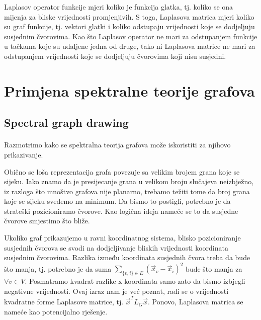 \documentclass[11pt]{article}
\begin{document}
	Laplasov operator funkcije mjeri koliko je funkcija glatka, tj. koliko se ona mijenja za bliske vrijednosti promjenjivih.
	S toga, Laplasova matrica mjeri koliko su graf funkcije, tj. vektori glatki i koliko odstupaju vrijednosti koje se dodjeljuju susjednim čvorovima.
	Kao što Laplasov operator ne mari za odstupanjem funkcije u tačkama koje su udaljene jedna od druge, tako ni Laplasova matrice ne mari za odstupanjem vrijednosti koje se dodjeljuju čvorovima koji nisu susjedni.
	
	\section{Primjena spektralne teorije grafova}

	\subsection{Spectral graph drawing}
	\paragraph{}
	Razmotrimo kako se spektralna teorija grafova može iskoristiti za njihovo prikazivanje. 

	Obično se loša reprezentacija grafa povezuje sa velikim brojem grana koje se sijeku.
	Iako znamo da je presijecanje grana u velikom broju slučajeva neizbježno, iz razloga što mnoštvo grafova nije planarno,
	trebamo težiti tome da broj grana koje se sijeku svedemo na minimum.
    Da bismo to postigli, potrebno je da strateški pozicioniramo čvorove.
	Kao logična ideja nameće se to da susjedne čvorove smjestimo što bliže.
    
	Ukoliko graf prikazujemo u ravni koordinatnog sistema, blisko pozicioniranje susjednih čvorova se svodi na dodjeljivanje bliskih vrijednosti koordinata susjednim čvorovima.
    Razlika između koordinata susjednih čvora treba da bude što manja, tj. potrebno je da suma $\sum_{\{v,i\} \in E} (\vec{x}_v - \vec{x}_i)^2$ bude što manja za $\forall v \in V$.
	Posmatramo kvadrat razlike x koordinata samo zato da bismo izbjegli negativne vrijednosti.
    Ovaj izraz nam je već poznat, radi se o vrijednosti kvadratne forme Laplasove matrice, tj. $\vec{x}^T L_G \vec{x}$. Ponovo, Laplasova matrica se nameće kao potencijalno rješenje.
\end{document}
